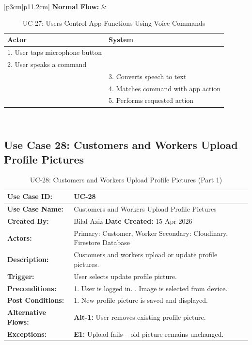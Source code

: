 \newpage

{\small
\renewcommand{\arraystretch}{1.05}
\begin{table}[H]
\centering
\begin{tabular}{|p{3cm}|p{11.2cm}|}
\hline
\textbf{Normal Flow:} &
\begin{tabular}[t]{|p{5.4cm}|p{5.4cm}|}
\hline
\textbf{Actor} & \textbf{System} \\ \hline
1. User taps microphone button & \\ \hline
2. User speaks a command & \\ \hline
 & 3. Converts speech to text \\ \hline
 & 4. Matches command with app action \\ \hline
 & 5. Performs requested action \\ \hline
\end{tabular} \\ \hline
\end{tabular}
\caption{UC-27: Users Control App Functions Using Voice Commands}
\end{table}
}

\newpage

\subsection*{Use Case 28: Customers and Workers Upload Profile Pictures}

{\small
\renewcommand{\arraystretch}{1.05}
\begin{table}[H]
\centering
\begin{tabular}{|p{3cm}|p{11.2cm}|}
\hline
\textbf{Use Case ID:} & UC-28 \\ \hline
\textbf{Use Case Name:} & Customers and Workers Upload Profile Pictures \\ \hline
\textbf{Created By:} & Bilal Aziz \hfill \textbf{Date Created:} 15-Apr-2026 \\ \hline
\textbf{Actors:} & Primary: Customer, Worker \quad Secondary: Cloudinary, Firestore Database \\ \hline
\textbf{Description:} & Customers and workers upload or update profile pictures. \\ \hline
\textbf{Trigger:} & User selects update profile picture. \\ \hline
\textbf{Preconditions:} & 1. User is logged in. \newline 2. Image is selected from device. \\ \hline
\textbf{Post Conditions:} & 1. New profile picture is saved and displayed. \\ \hline
\textbf{Alternative Flows:} & \textbf{Alt-1:} User removes existing profile picture. \\ \hline
\textbf{Exceptions:} & \textbf{E1:} Upload fails -- old picture remains unchanged. \\ \hline
\end{tabular}
\caption*{UC-28: Customers and Workers Upload Profile Pictures (Part 1)}
\end{table}
}

